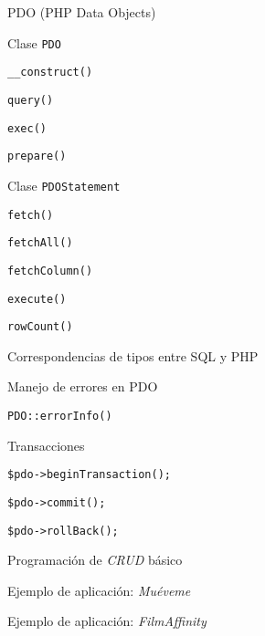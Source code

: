 \begin{longenum}
    \begin{longenum}
        \item PDO (PHP Data Objects)
        \begin{longenum}
            \item Clase \texttt{PDO}
            \begin{longenum}
                \item \texttt{\_\_construct()}
                \item \texttt{query()}
                \item \texttt{exec()}
                \item \texttt{prepare()}
            \end{longenum}
            \item Clase \texttt{PDOStatement}
            \begin{longenum}
                \item \texttt{fetch()}
                \item \texttt{fetchAll()}
                \item \texttt{fetchColumn()}
                \item \texttt{execute()}
                \item \texttt{rowCount()}
            \end{longenum}
            \item Correspondencias de tipos entre SQL y PHP
            \item Manejo de errores en PDO
            \begin{longenum}
                \item \texttt{PDO::errorInfo()}
            \end{longenum}
            \item Transacciones 
            \begin{longenum}
                \item \texttt{\$pdo->beginTransaction();}
                \item \texttt{\$pdo->commit();}
                \item \texttt{\$pdo->rollBack();}
            \end{longenum}
        \end{longenum}
        \item Programación de \textit{CRUD} básico
        \begin{longenum}
            \item Ejemplo de aplicación: \textit{Muéveme}
            \item Ejemplo de aplicación: \textit{FilmAffinity}

\end{longenum}
\end{longenum}
\end{longenum}
